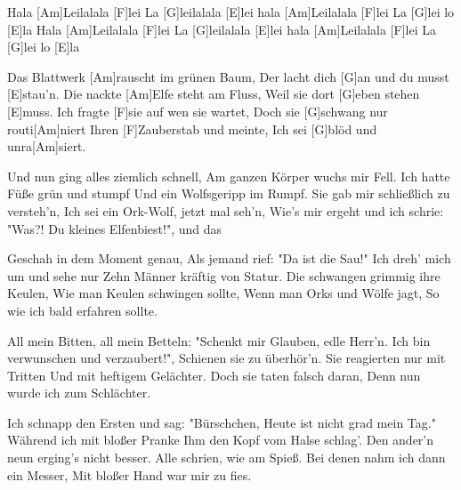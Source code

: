 

\begin{guitar}
	
	Hala [Am]Leilalala [F]lei La [G]leilalala [E]lei hala [Am]Leilalala [F]lei La [G]lei lo [E]la
	Hala [Am]Leilalala [F]lei La [G]leilalala [E]lei hala [Am]Leilalala [F]lei La [G]lei lo [E]la
	
	Das Blattwerk [Am]rauscht im grünen Baum,
	Der lacht dich [G]an und du musst [E]stau'n.
	Die nackte [Am]Elfe steht am Fluss,
	Weil sie dort [G]eben stehen [E]muss.
	Ich fragte [F]sie auf wen sie wartet,
	Doch sie [G]schwang nur routi[Am]niert
	Ihren [F]Zauberstab und meinte,
	Ich sei [G]blöd und unra[Am]siert.
	\footnotesize
	 
	
	Und nun ging alles ziemlich schnell,
	Am ganzen Körper wuchs mir Fell.
	Ich hatte Füße grün und stumpf
	Und ein Wolfsgeripp im Rumpf.
	Sie gab mir schließlich zu versteh'n,
	Ich sei ein Ork-Wolf, jetzt mal seh'n,
	Wie's mir ergeht und ich schrie: "Was?!
	Du kleines Elfenbiest!", und das
	
	Geschah in dem Moment genau,
	Als jemand rief: "Da ist die Sau!"
	Ich dreh' mich um und sehe nur
	Zehn Männer kräftig von Statur.
	Die schwangen grimmig ihre Keulen,
	Wie man Keulen schwingen sollte,
	Wenn man Orks und Wölfe jagt,
	So wie ich bald erfahren sollte.
	
	 
	\pagebreak
	All mein Bitten, all mein Betteln:
	"Schenkt mir Glauben, edle Herr'n.
	Ich bin verwunschen und verzaubert!",
	Schienen sie zu überhör'n.
	Sie reagierten nur mit Tritten
	Und mit heftigem Gelächter.
	Doch sie taten falsch daran,
	Denn nun wurde ich zum Schlächter.
	
	 
	
	Ich schnapp den Ersten und sag: "Bürschchen,
	Heute ist nicht grad mein Tag."
	Während ich mit bloßer Pranke
	Ihm den Kopf vom Halse schlag'.
	Den ander'n neun erging's nicht besser.
	Alle schrien, wie am Spieß.
	Bei denen nahm ich dann ein Messer,
	Mit bloßer Hand war mir zu fies.
	
	 
	

\end{guitar}
